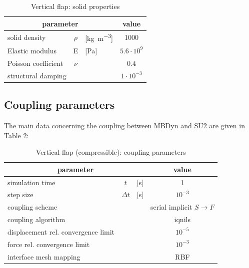 \begin{table}[!htb]
	\begin{center}
		\begin{tabular}{ l c  l | c } 
			\multicolumn{3}{c|}{parameter} & value   \\ 
			\hline
			solid density  & $\rho$ & [\si{kg.m^{-3}}] & 1000    \\
			Elastic modulus  & E & [\si{Pa}] & $ 5.6 \cdot 10^9$    \\
			Poisson coefficient & $\nu$ & & $0.4$  \\
			structural damping & & & $1 \cdot 10^{-3}$ \\
		\end{tabular}
	\end{center}
	\caption{Vertical flap: solid properties}
	\label{table:comp-solid}
\end{table}

\subsection{Coupling parameters}

The main data concerning the coupling between MBDyn and SU2 are given in Table \ref{table:comp-coupling}:

\begin{table}[!htb]
	\begin{center}
		\begin{tabular}{ l c  l| c } 
			\multicolumn{3}{c|}{parameter} & value   \\ 
			\hline
			simulation time  & $t$& [\si{s}] & 1      \\
			step size & $\Delta t$ & [\si{s}] & $10^{-3}$   \\
			\hline
			coupling scheme & & & serial implicit $S\rightarrow F$  \\
			coupling algorithm & & &  \acrshort{iqnils}  \\
			displacement rel. convergence limit & & & $10^{-5}$ \\
			force rel. convergence limit &&  & $10^{-3}$  \\
      		interface mesh mapping & & & RBF  \\
			
		\end{tabular}
	\end{center}
	\caption{Vertical flap (compressible): coupling parameters}
	\label{table:comp-coupling}
\end{table}


